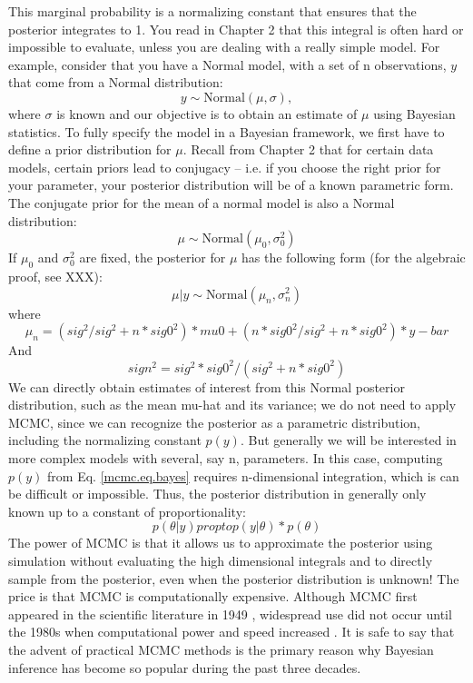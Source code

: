 This marginal probability is a normalizing constant that ensures that
the posterior integrates to 1. You read in Chapter 2 that this
integral is often hard or impossible to evaluate, unless you are
dealing with a really simple model.  For example, consider that you
have a Normal model, with a set of n observations, $y$ that come from a
Normal distribution:
\[
 y \sim \mbox{Normal}(\mu, \sigma),
\]
where $\sigma$ is known and our objective is to obtain an estimate of
$\mu$ using Bayesian statistics. To fully specify the model in a Bayesian
framework, we first have to define a prior distribution for $\mu$. Recall
from Chapter 2 that for certain data models, certain priors lead to
conjugacy – i.e. if you choose the right prior for your parameter,
your posterior distribution will be of a known parametric form. The
conjugate prior for the mean of a normal model is also a Normal
distribution:
\[
\mu \sim \mbox{Normal}(\mu_0, \sigma_{0}^{2})
\]
If $\mu_{0}$ and $\sigma_{0}^{2}$ are fixed, the posterior for $\mu$ has the following form (for the algebraic proof, see XXX):
\begin{equation}
\mu|y \sim \mbox{Normal}(\mu_{n}, \sigma_{n}^{2})
\label{mcmc.eq.mu-posterior}
\end{equation}
where
\[ 
\mu_{n} =  (sig^2 / sig^2  +n* sig0^2)*  mu0 + (n * sig0^2 / sig^2  +n* sig0^2) *y-bar 
\]
And
\[
 sign^2 = sig^2 * sig0^2 / (sig^2 + n*sig0^2)
\]
We can directly obtain estimates of interest from this Normal posterior distribution, such as the mean mu-hat and its variance; we do not need to apply MCMC, since we can recognize the posterior as a parametric distribution, including the normalizing constant $p(y)$.
But generally we will be interested in more complex models with several, say n, parameters. In this case, computing $p(y)$ from Eq. \ref{mcmc.eq.bayes} requires n-dimensional integration, which is can be difficult or impossible. Thus, the posterior distribution in generally only known up to a constant of proportionality:
\[
p(\theta|y) propto p(y|\theta) * p(\theta)
\]
The power of MCMC is that it allows us to approximate the posterior using simulation without evaluating the high dimensional integrals and to directly sample from the posterior, even when the posterior distribution is unknown! The price is that MCMC is computationally expensive. Although MCMC first appeared in the scientific literature in 1949 \citep{metropolis_etal:1949}, widespread use did not occur until the 1980s when computational power and speed increased \citep{gelfand_smith:1990}. It is safe to say that the advent of practical MCMC methods is the primary reason why Bayesian inference has become so popular during the past three decades. 
